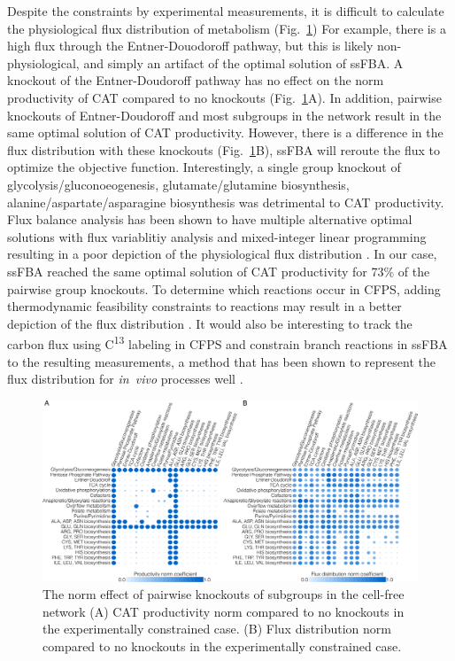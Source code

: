 \documentclass[journal=asbcd6,manuscript=article]{achemso}
\begin{document}
Despite the constraints by experimental measurements, it is difficult to calculate the physiological flux distribution of metabolism (Fig.~\ref{fig:norm}) 
For example, there is a high flux through the Entner-Douodoroff pathway, but this is likely non-physiological, and simply an artifact of the optimal solution of ssFBA.
A knockout of the Entner-Doudoroff pathway has no effect on the norm productivity of CAT compared to no knockouts (Fig.~\ref{fig:norm}A).
In addition, pairwise knockouts of Entner-Doudoroff and most subgroups in the network result in the same optimal solution of CAT productivity.
However, there is a difference in the flux distribution with these knockouts (Fig.~\ref{fig:norm}B), ssFBA will reroute the flux to optimize the objective function.
Interestingly, a single group knockout of glycolysis/gluconoeogenesis, glutamate/glutamine biosynthesis, alanine/aspartate/asparagine biosynthesis was detrimental to CAT productivity.
Flux balance analysis has been shown to have multiple alternative optimal solutions with flux variablitiy analysis and mixed-integer linear programming resulting in a poor depiction of the physiological flux distribution \cite{LEE2000711, Mahadevan2003264, Schuetz119}. 
In our case, ssFBA reached the same optimal solution of CAT productivity for 73\% of the pairwise group knockouts. 
To determine which reactions occur in CFPS, adding thermodynamic feasibility constraints to reactions may result in a better depiction of the flux distribution \cite{Henry:2007,Hamilton:2013}.
It would also be interesting to track the carbon flux using C\textsuperscript{13} labeling in CFPS and constrain branch reactions in ssFBA to the resulting measurements, a method that has been shown to represent the flux distribution for \emph{in~vivo} processes well \cite{Zamboni:2009}.
\begin{figure}[t!]
\includegraphics[width=1.0\textwidth]{./Figures/Norm.pdf}
\caption{The norm effect of pairwise knockouts of subgroups in the cell-free network (A) CAT productivity norm compared to no knockouts in the experimentally constrained case. (B) Flux distribution norm compared to no knockouts in the experimentally constrained case.}
\label{fig:norm}
\end{figure}
\end{document}
